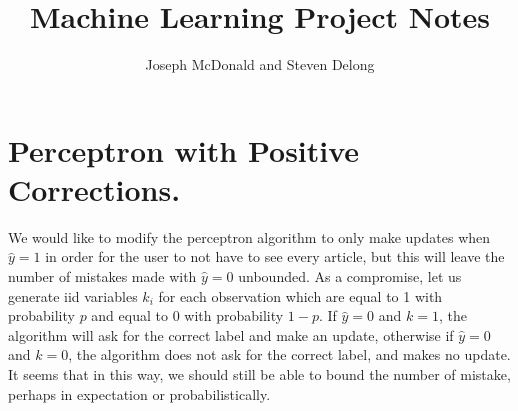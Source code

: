 \documentclass{article}
\title{Machine Learning Project Notes}
\author{Joseph McDonald and Steven Delong}
\begin{document}
\maketitle

\section*{Perceptron with Positive Corrections.}

We would like to modify the perceptron algorithm to only make updates when $\hat{y} = 1$ in order for the user to not have to see every article, but this will leave the number of mistakes made with $\hat{y} = 0$ unbounded. As a compromise, let us generate iid variables $k_i$ for each observation which are equal to 1 with probability $p$ and equal to $0$ with probability $1-p$.  If $\hat{y} = 0$ and $k=1$, the algorithm will ask for the correct label and make an update, otherwise if $\hat{y} = 0$ and $k=0$, the algorithm does not ask for the correct label, and makes no update.  It seems that in this way, we should still be able to bound the number of mistake, perhaps in expectation or probabilistically.\\
\end{document}
